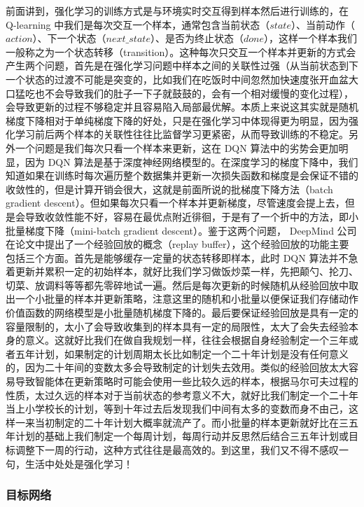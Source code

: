 前面讲到，强化学习的训练方式是与环境实时交互得到样本然后进行训练的，在 Q-learning 中我们是每次交互一个样本，通常包含当前状态（$state$）、当前动作（$action$）、下一个状态（$next\_state$）、是否为终止状态（$done$），这样一个样本我们一般称之为一个状态转移（transition）。这种每次只交互一个样本并更新的方式会产生两个问题，首先是在强化学习问题中样本之间的关联性过强（从当前状态到下一个状态的过渡不可能是突变的，比如我们在吃饭时中间忽然加快速度张开血盆大口猛吃也不会导致我们的肚子一下子就鼓鼓的，会有一个相对缓慢的变化过程），会导致更新的过程不够稳定并且容易陷入局部最优解。本质上来说这其实就是随机梯度下降相对于单纯梯度下降的好处，只是在强化学习中体现得更为明显，因为强化学习前后两个样本的关联性往往比监督学习更紧密，从而导致训练的不稳定。另外一个问题是我们每次只看一个样本来更新，这在 DQN 算法中的劣势会更加明显，因为 DQN 算法是基于深度神经网络模型的。在深度学习的梯度下降中，我们知道如果在训练时每次遍历整个数据集并更新一次损失函数和梯度是会保证不错的收敛性的，但是计算开销会很大，这就是前面所说的批梯度下降方法（batch gradient descent）。但如果每次只看一个样本并更新梯度，尽管速度会提上去，但是会导致收敛性能不好，容易在最优点附近徘徊，于是有了一个折中的方法，即小批量梯度下降（mini-batch gradient descent）。鉴于这两个问题， DeepMind 公司 在论文中提出了一个经验回放的概念（replay buffer），这个经验回放的功能主要包括三个方面。首先是能够缓存一定量的状态转移即样本，此时 DQN 算法并不急着更新并累积一定的初始样本，就好比我们学习做饭炒菜一样，先把颠勺、抡刀、切菜、放调料等等都先零碎地试一遍。然后是每次更新的时候随机从经验回放中取出一个小批量的样本并更新策略，注意这里的随机和小批量以便保证我们存储动作价值函数的网络模型是小批量随机梯度下降的。最后要保证经验回放是具有一定的容量限制的，太小了会导致收集到的样本具有一定的局限性，太大了会失去经验本身的意义。这就好比我们在做自我规划一样，往往会根据自身经验制定一个三年或者五年计划，如果制定的计划周期太长比如制定一个二十年计划是没有任何意义的，因为二十年间的变数太多会导致制定的计划失去效用。类似的经验回放太大容易导致智能体在更新策略时可能会使用一些比较久远的样本，根据马尔可夫过程的性质，太过久远的样本对于当前状态的参考意义不大，就好比我们制定一个二十年当上小学校长的计划，等到十年过去后发现我们中间有太多的变数而身不由己，这样一来当初制定的二十年计划大概率就流产了。而小批量的样本更新就好比在三五年计划的基础上我们制定一个每周计划，每周行动并反思然后结合三五年计划或目标调整下一周的行动，这种方式往往是最高效的。到这里，我们又不得不感叹一句，生活中处处是强化学习！
\subsubsection{目标网络}


